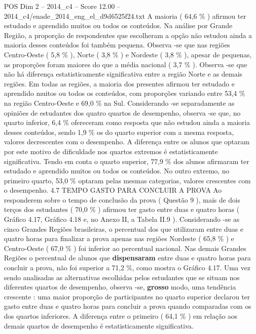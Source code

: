 \begin{textsample}{POS Dim 2 – 2014\_c4 – Score 12.00 – 2014\_c4/enade\_2014\_eng\_el\_d9d6525f24.txt}
A maioria ( 64,6 \% ) afirmou ter estudado e aprendido muitos ou todos os conteúdos.
Na análise por Grande Região, a proporção de respondentes que escolheram a opção não estudou ainda a maioria desses conteúdos foi também pequena.
Observa -se que nas regiões Centro-Oeste ( 5,8 \% ), Norte ( 3,8 \% ) e Nordeste ( 3,8 \% ), apesar de pequenas, as proporções foram maiores do que a média nacional ( 3,7 \% ).
Observa -se que não há diferença estatisticamente significativa entre a região Norte e as demais regiões.
Em todas as regiões, a maioria dos presentes afirmou ter estudado e aprendido muitos ou todos os conteúdos, com proporções variando entre 53,4 \% na região Centro-Oeste e 69,0 \% na Sul.
Considerando -se separadamente as opiniões de estudantes dos quatro quartos de desempenho, observa -se que, no quarto inferior, 6,4 \% ofereceram como resposta que não estudou ainda a maioria desses conteúdos, sendo 1,9 \% os do quarto superior com a mesma resposta, valores decrescentes com o desempenho.
A diferença entre os alunos que optaram por este motivo de dificuldade nos quartos extremos é estatisticamente significativa.
Tendo em conta o quarto superior, 77,9 \% dos alunos afirmaram ter estudado e aprendido muitos ou todos os conteúdos.
No outro extremo, no primeiro quarto, 53,0 \% optaram pelas mesmas categorias, valores crescentes com o desempenho. 4.7 TEMPO GASTO PARA CONCLUIR A PROVA Ao responderem sobre o tempo de conclusão da prova ( Questão 9 ), mais de dois terços dos estudantes ( 70,0 \% ) afirmou ter gasto entre duas e quatro horas ( Gráfico 4.17, Gráfico 4.18 e, no Anexo II, a Tabela II.9 ).
Considerando -se as cinco Grandes Regiões brasileiras, o percentual dos que utilizaram entre duas e quatro horas para finalizar a prova apenas nas regiões Nordeste ( 65,8 \% ) e Centro-Oeste ( 67,0 \% ) foi inferior ao percentual nacional.
Nas demais Grandes Regiões o percentual de alunos que \textbf{dispensaram} entre duas e quatro horas para concluir a prova, não foi superior a 71,2 \%, como mostra o Gráfico 4.17.
Uma vez sendo analisadas as alternativas escolhidas pelos estudantes que se situam nos diferentes quartos de desempenho, observa -se, \textbf{grosso} modo, uma tendência crescente : uma maior proporção de participantes no quarto superior declarou ter gasto entre duas e quatro horas para concluir a prova quando comparadas com os dos quartos inferiores.
A diferença entre o primeiro ( 64,1 \% ) em relação aos demais quartos de desempenho é estatisticamente significativa.

\end{textsample}
